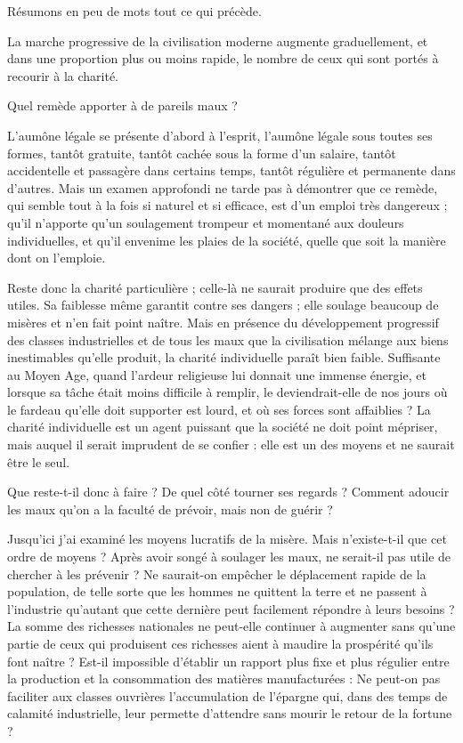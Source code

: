 \documentclass[french,twoside]{book} %
\begin{document}
\noindent Résumons en peu de mots tout ce qui précède.\par
La marche progressive de la civilisation moderne augmente graduellement, et dans une proportion plus ou moins rapide, le nombre de ceux qui sont portés à recourir à la charité.\par
Quel remède apporter à de pareils maux ?\par
L'aumône légale se présente d’abord à l’esprit, l’aumône légale sous toutes ses formes, tantôt gratuite, tantôt cachée sous la forme d’un salaire, tantôt accidentelle et passagère dans certains temps, tantôt régulière et permanente dans d’autres. Mais un examen approfondi ne tarde pas à démontrer que ce remède, qui semble tout à la fois si naturel et si efficace, est d’un emploi très dangereux ; qu’il n’apporte qu’un soulagement trompeur et momentané aux douleurs individuelles, et qu’il envenime les plaies de la société, quelle que soit la manière dont on l’emploie.\par
Reste donc la charité particulière ; celle-là ne saurait produire que des effets utiles. Sa faiblesse même garantit contre ses dangers ; elle soulage beaucoup de misères et n’en fait point naître. Mais en présence du développement progressif des classes industrielles et de tous les maux que la civilisation mélange aux biens inestimables qu’elle produit, la charité individuelle paraît bien faible. Suffisante au Moyen Age, quand l’ardeur religieuse lui donnait une immense énergie, et lorsque sa tâche était moins difficile à remplir, le deviendrait-elle de nos jours où le fardeau qu’elle doit supporter est lourd, et où ses forces sont affaiblies ? La charité individuelle est un agent puissant que la société ne doit point mépriser, mais auquel il serait imprudent de se confier : elle est un des moyens et ne saurait être le seul.\par
Que reste-t-il donc à faire ? De quel côté tourner ses regards ? Comment adoucir les maux qu’on a la faculté de prévoir, mais non de guérir ?\par
Jusqu’ici j’ai examiné les moyens lucratifs de la misère. Mais n’existe-t-il que cet ordre de moyens ? Après avoir songé à soulager les maux, ne serait-il pas utile de chercher à les prévenir ? Ne saurait-on empêcher le déplacement rapide de la population, de telle sorte que les hommes ne quittent la terre et ne passent à l’industrie qu’autant que cette dernière peut facilement répondre à leurs besoins ? La somme des richesses nationales ne peut-elle continuer à augmenter sans qu’une partie de ceux qui produisent ces richesses aient à maudire la prospérité qu’ils font naître ? Est-il impossible d’établir un rapport plus fixe et plus régulier entre la production et la consommation des matières manufacturées : Ne peut-on pas faciliter aux classes ouvrières l’accumulation de l’épargne qui, dans des temps de calamité industrielle, leur permette d’attendre sans mourir le retour de la fortune ?\par
\end{document}
